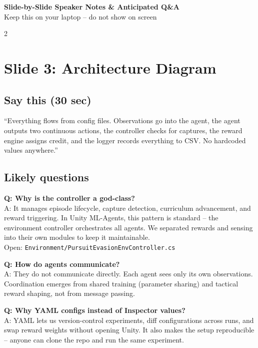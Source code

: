 \documentclass[9pt,a4paper]{article}
\begin{document}
\begin{center}
{\Large\bfseries Slide-by-Slide Speaker Notes \& Anticipated Q\&A} \\[2pt]
{\small Keep this on your laptop -- do not show on screen}
\end{center}
\vspace{-2pt}

\begin{multicols}{2}

\section{Slide 3: Architecture Diagram}

\subsection{Say this (30 sec)}
``Everything flows from config files. Observations go into the agent, the agent outputs two continuous actions, the controller checks for captures, the reward engine assigns credit, and the logger records everything to CSV. No hardcoded values anywhere.''

\subsection{Likely questions}
\textbf{Q: Why is the controller a god-class?} \\
A: It manages episode lifecycle, capture detection, curriculum advancement, and reward triggering. In Unity ML-Agents, this pattern is standard -- the environment controller orchestrates all agents. We separated rewards and sensing into their own modules to keep it maintainable. \\
{\scriptsize\color{gray} Open: \texttt{Environment/PursuitEvasionEnvController.cs}}

\textbf{Q: How do agents communicate?} \\
A: They do not communicate directly. Each agent sees only its own observations. Coordination emerges from shared training (parameter sharing) and tactical reward shaping, not from message passing.

\textbf{Q: Why YAML configs instead of Inspector values?} \\
A: YAML lets us version-control experiments, diff configurations across runs, and swap reward weights without opening Unity. It also makes the setup reproducible -- anyone can clone the repo and run the same experiment.


\end{multicols}
\end{document}
